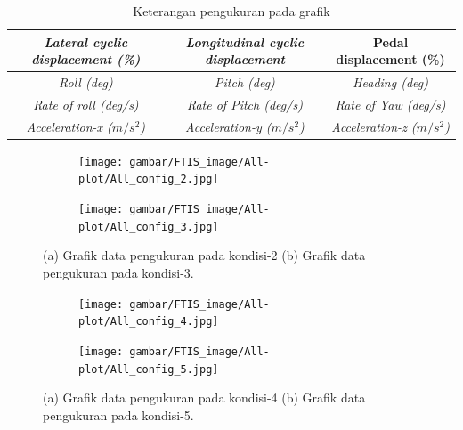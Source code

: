\begin{table}[]
	\caption{Keterangan pengukuran pada grafik}
	\label{tb:penyajian_data}
	\begin{tabular}{|c|c|c|}
		\hline
		\textit{Lateral cyclic displacement (\%)} & \textit{Longitudinal cyclic displacement} & Pedal displacement (\%)           \\ \hline
		\textit{Roll (deg)}                       & \textit{Pitch (deg)}                      & \textit{Heading (deg)}            \\ \hline
		\textit{Rate of roll (deg/s)}             & \textit{Rate of Pitch (deg/s)}            & \textit{Rate of Yaw (deg/s)}      \\ \hline
		\textit{Acceleration-x ($m/s^2$)}         & \textit{Acceleration-y ($m/s^2$)}         & \textit{Acceleration-z ($m/s^2$)} \\ \hline
	\end{tabular}
\end{table}



\begin{figure}[H]
	\centering
	\begin{subfigure}{0.49\textwidth}
		\centering
		\texttt{[image: gambar/FTIS\_image/All-plot/All\_config\_2.jpg]}
		\caption{}
		\label{fig:condition_2}
	\end{subfigure}
	\centering
	\begin{subfigure}{0.49\textwidth}
		\centering
		\texttt{[image: gambar/FTIS\_image/All-plot/All\_config\_3.jpg]}
		\caption{}
		\label{fig:condition_3}
	\end{subfigure}
	\caption{(a) Grafik data pengukuran pada kondisi-2 (b) Grafik data pengukuran pada kondisi-3.}
\end{figure}

\begin{figure}[H]
	\begin{subfigure}{0.49\textwidth}
		\centering
		\texttt{[image: gambar/FTIS\_image/All-plot/All\_config\_4.jpg]}
		\caption{}
		\label{fig:condition_4}
	\end{subfigure}
	\centering
	\begin{subfigure}{0.49\textwidth}
		\centering
		\texttt{[image: gambar/FTIS\_image/All-plot/All\_config\_5.jpg]}
		\caption{}
		\label{fig:condition_5}
	\end{subfigure}
	\caption{(a) Grafik data pengukuran pada kondisi-4 (b) Grafik data pengukuran pada kondisi-5.}
\end{figure}


